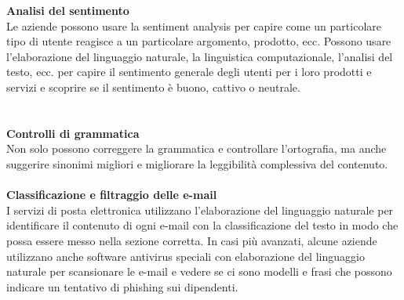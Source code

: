 \textbf{Analisi del sentimento}\\
Le aziende possono usare la sentiment analysis per capire come un particolare tipo di utente reagisce a un particolare argomento, prodotto, ecc. Possono usare l'elaborazione del linguaggio naturale, la linguistica computazionale, l'analisi del testo, ecc. per capire il sentimento generale degli utenti per i loro prodotti e servizi e scoprire se il sentimento è buono, cattivo o neutrale.\\\\
\\
\textbf{Controlli di grammatica}\\
Non solo possono correggere la grammatica e controllare l'ortografia, ma anche suggerire sinonimi migliori e migliorare la leggibilità complessiva del contenuto.\\\\
\textbf{Classificazione e filtraggio delle e-mail}\\
I servizi di posta elettronica utilizzano l'elaborazione del linguaggio naturale per identificare il contenuto di ogni e-mail con la classificazione del testo in modo che possa essere messo nella sezione corretta. In casi più avanzati, alcune aziende utilizzano anche software antivirus speciali con elaborazione del linguaggio naturale per scansionare le e-mail e vedere se ci sono modelli e frasi che possono indicare un tentativo di phishing sui dipendenti.
